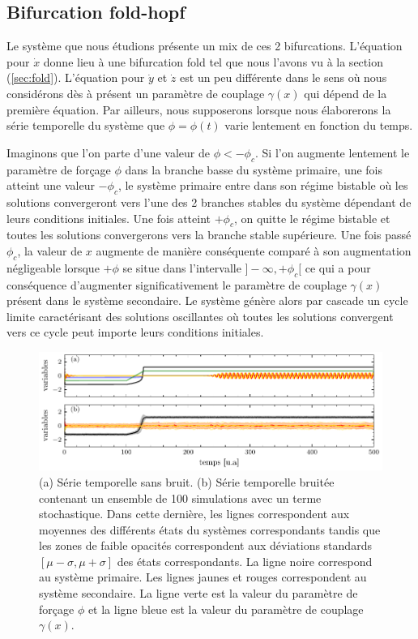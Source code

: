 \subsection{Bifurcation fold-hopf}

Le système que nous étudions présente un mix de ces 2 bifurcations. L'équation pour $\dot{x}$ donne lieu à une bifurcation fold tel que nous l'avons vu à la section (\ref{sec:fold}). L'équation pour $\dot{y}$ et $\dot{z}$ est un peu différente dans le sens où nous considérons dès à présent un paramètre de couplage $\gamma(x)$ qui dépend de la première équation. Par ailleurs, nous supposerons lorsque nous élaborerons la série temporelle du système que $\phi = \phi(t)$ varie lentement en fonction du temps.


Imaginons que l’on parte d’une valeur de $\phi < - \phi_c$. Si l’on augmente lentement le paramètre de forçage $\phi$ dans la branche basse du système primaire, une fois atteint une valeur $-\phi_c$, le système primaire entre dans son régime bistable où les solutions convergeront vers l’une des 2 branches stables du système dépendant de leurs conditions initiales. Une fois atteint $+\phi_c$, on quitte le régime bistable et toutes les solutions convergerons vers la branche stable supérieure. Une fois passé $\phi_c$, la valeur de $x$ augmente de manière conséquente comparé à son augmentation négligeable lorsque $+\phi$ se situe dans l’intervalle $]-\infty, +\phi_c[$ ce qui a pour conséquence d’augmenter significativement le paramètre de couplage $\gamma(x)$ présent dans le système secondaire. Le système génère alors par cascade un cycle limite caractérisant des solutions oscillantes où toutes les solutions convergent vers ce cycle peut importe leurs conditions initiales.

\begin{figure}[ht!]
  \centering
  \includegraphics{figures/time-series.pdf}
  \caption{(a) Série temporelle sans bruit. (b) Série temporelle bruitée contenant un ensemble de 100 simulations avec un terme stochastique. Dans cette dernière, les lignes correspondent aux moyennes des différents états du systèmes correspondants tandis que les zones de faible opacités correspondent aux déviations standards $[\mu - \sigma, \mu + \sigma]$ des états correspondants. La ligne noire correspond au système primaire. Les lignes jaunes et rouges correspondent au système secondaire. La ligne verte est la valeur du paramètre de forçage $\phi$ et la ligne bleue est la valeur du paramètre de couplage $\gamma(x)$.}
  \label{fig:time-series}
\end{figure}

